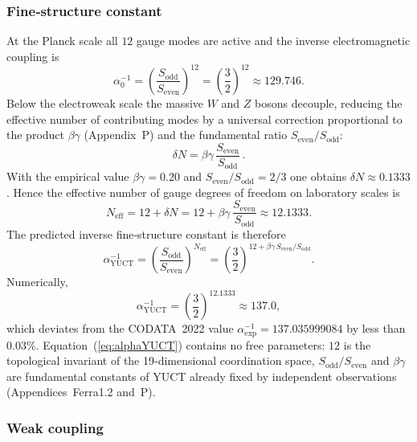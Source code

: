 \documentclass[12pt,a4paper]{article}
\begin{document}
	\subsubsection{Fine‑structure constant}
	
	At the Planck scale all \(12\) gauge modes are active and the inverse electromagnetic coupling is
	\begin{equation}
		\alpha_0^{-1} = \left(\frac{S_{\mathrm{odd}}}{S_{\mathrm{even}}}\right)^{\!12}
		= \left(\frac{3}{2}\right)^{\!12} \approx 129.746 .
	\end{equation}
	Below the electroweak scale the massive \(W\) and \(Z\) bosons decouple, reducing the effective
	number of contributing modes by a universal correction proportional to the product
	\(\beta\gamma\) (Appendix~P) and the fundamental ratio \(S_{\mathrm{even}}/S_{\mathrm{odd}}\):
	\begin{equation}
		\delta N = \beta\gamma\,\frac{S_{\mathrm{even}}}{S_{\mathrm{odd}}}\, .
		\label{eq:deltaN}
	\end{equation}
	With the empirical value \(\beta\gamma = 0.20\) and \(S_{\mathrm{even}}/S_{\mathrm{odd}} = 2/3\) one
	obtains \(\delta N \approx 0.1333\).  Hence the effective number of gauge degrees of freedom on
	laboratory scales is
	\begin{equation}
		N_{\mathrm{eff}} = 12 + \delta N = 12 + \beta\gamma\,\frac{S_{\mathrm{even}}}{S_{\mathrm{odd}}}
		\approx 12.1333 .
	\end{equation}
	The predicted inverse fine‑structure constant is therefore
	\begin{equation}
		\boxed{\alpha^{-1}_{\mathrm{YUCT}} =
			\left(\frac{S_{\mathrm{odd}}}{S_{\mathrm{even}}}\right)^{\!N_{\mathrm{eff}}}
			= \left(\frac{3}{2}\right)^{\!12 + \beta\gamma\,S_{\mathrm{even}}/S_{\mathrm{odd}}} } .
		\label{eq:alphaYUCT}
	\end{equation}
	Numerically,
	\[
	\alpha^{-1}_{\mathrm{YUCT}} = \left(\frac{3}{2}\right)^{\!12.1333} \approx 137.0 ,
	\]
	which deviates from the CODATA~2022 value \(\alpha^{-1}_{\mathrm{exp}} = 137.035999084\) by less
	than \(0.03\%\).  Equation~(\ref{eq:alphaYUCT}) contains no free parameters: \(12\) is the
	topological invariant of the 19‑dimensional coordination space,
	\(S_{\mathrm{odd}}/S_{\mathrm{even}}\) and \(\beta\gamma\) are fundamental constants of YUCT
	already fixed by independent observations (Appendices~Ferra1.2 and~P).
	
	\subsubsection{Weak coupling}
	
\end{document}

